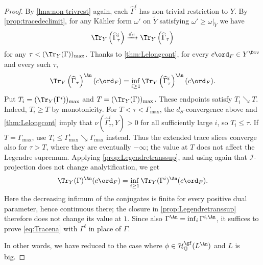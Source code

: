 \begin{proof}
    By \cref{lma:non-trivrest} again, each $\widehat{\Gamma}^{i}$ has non-trivial restriction to $Y$. By \cref{prop:tracedeclimit}, for any K\"ahler form $\omega'$ on $\widetilde{Y}$ satisfying $\omega'\geq \omega|_{\widetilde{Y}}$ we have
    \[
    \Tr_Y \left( \widehat{\Gamma}^{i}_{\tau} \right)\xrightarrow{d_S} \Tr_Y \left( \widehat{\Gamma}_{\tau}\right)
    \]
    for any $\tau<(\Tr_Y(\Gamma))_{\max}$. Thanks to \cref{thm:Lelongcont}, for every $c\ord_F\in Y^{\Div}$ and every such $\tau$,
    \[
    \Tr_Y \left( \widehat{\Gamma}_{\tau} \right)^{\An}(c\ord_F)=\inf_{i\geq 1}\Tr_Y \left( \widehat{\Gamma}^{i}_{\tau} \right)^{\An}(c\ord_F).
    \]
    Put $T_i=(\Tr_Y(\Gamma^i))_{\max}$ and $T=(\Tr_Y(\Gamma))_{\max}$. These endpoints satisfy $T_i\searrow T$. Indeed, $T_i\geq T$ by monotonicity. For $T<\tau<\Gamma_{\max}$, the $d_S$-convergence above and \cref{thm:Lelongcont} imply that $\nu(\widehat{\Gamma}^i_{\tau},Y)>0$ for all sufficiently large $i$, so $T_i\leq\tau$. If $T=\Gamma_{\max}$, use $T_i\leq\Gamma^i_{\max}\searrow\Gamma_{\max}$ instead. Thus the extended trace slices converge also for $\tau>T$, where they are eventually $-\infty$; the value at $T$ does not affect the Legendre supremum. Applying \cref{prop:Legendretranssup}, and using again that $\mathcal{I}$-projection does not change analytification, we get
    \[
    \Tr_Y(\Gamma)^{\An}(c\ord_F)=\inf_{i\geq 1}\Tr_Y(\Gamma^i)^{\An}(c\ord_F).
    \]
    Here the decreasing infimum of the conjugates is finite for every positive dual parameter, hence continuous there; the closure in \cref{prop:Legendretranssup} therefore does not change its value at $1$.
    Since also $\Gamma^{\An}=\inf_i \Gamma^{i,\An}$, it suffices to prove \eqref{eq:Tracena} with $\Gamma^i$ in place of $\Gamma$.

    In other words, we have reduced to the case where $\phi\in \mathcal{H}^{\gf}_{\mathbb{Q}}(L^{\An})$ and $L$ is big.


\end{proof}
